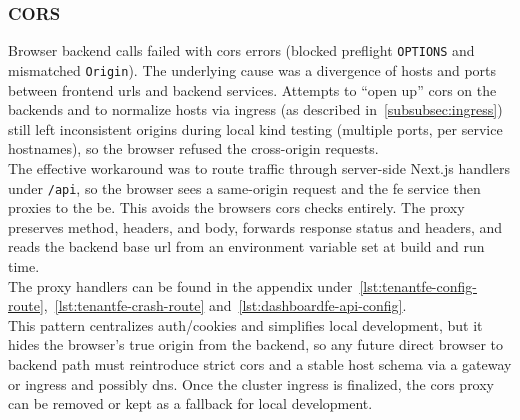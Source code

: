 \documentclass[11pt, a4paper, oneside, listof=totoc]{scrartcl}
\begin{document}
            \subsubsection{CORS}\label{subsubsec:challengesCORS}
                Browser backend calls failed with \gls{cors} errors (blocked preflight
                \texttt{OPTIONS} and mismatched \texttt{Origin}).
                The underlying cause was a divergence of hosts and ports between frontend
                \glspl{url} and backend services.
                Attempts to \enquote{open up} \gls{cors} on the backends and to normalize hosts via
                \gls{ingress} (as described in~\autoref{subsubsec:ingress}) still left inconsistent
                origins during local \gls{kind} testing (multiple ports, per service hostnames),
                so the browser refused the cross-origin requests.\\
                The effective workaround was to route traffic through server-side Next.js handlers
                under \texttt{/api}, so the browser sees a same-origin request and the \gls{fe}
                service then proxies to the \gls{be}.
                This avoids the browsers \gls{cors} checks entirely.
                The proxy preserves method, headers, and body, forwards response status and headers,
                and reads the backend base \gls{url} from an environment variable set at build and
                run time.\\
                The proxy handlers can be found in the appendix
                under~\autoref{lst:tenantfe-config-route},~\autoref{lst:tenantfe-crash-route}
                and~\autoref{lst:dashboardfe-api-config}.\\
                This pattern centralizes auth/cookies and simplifies local development, but it hides
                the browser's true origin from the backend, so any future direct browser to backend
                path must reintroduce strict \gls{cors} and a stable host schema via a gateway or
                \gls{ingress} and possibly \gls{dns}.
                Once the cluster \gls{ingress} is finalized, the \gls{cors} proxy can be removed or
                kept as a fallback for local development.
\end{document}
